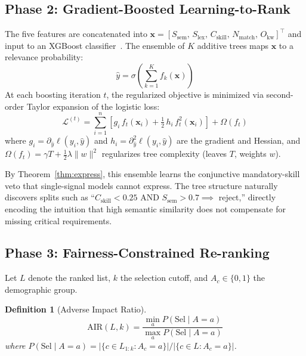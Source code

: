 \documentclass[smallcondensed,numbers]{sn-jnl}
\newtheorem{definition}{Definition}
\begin{document}
\subsection{Phase 2: Gradient-Boosted Learning-to-Rank}

The five features are concatenated into $\mathbf{x} = [S_{\mathrm{sem}},\, S_{\mathrm{lex}},\, C_{\mathrm{skill}},\, N_{\mathrm{match}},\, O_{\mathrm{kw}}]^\top$ and input to an XGBoost classifier~\cite{chen2016xgboost}. The ensemble of $K$ additive trees maps $\mathbf{x}$ to a relevance probability:
\begin{equation}
    \hat{y} = \sigma\!\left(\sum_{k=1}^K f_k(\mathbf{x})\right)
\end{equation}
At each boosting iteration $t$, the regularized objective is minimized via second-order Taylor expansion of the logistic loss:
\begin{equation}\label{eq:xgb}
    \mathcal{L}^{(t)} = \sum_{i=1}^n \left[ g_i\, f_t(\mathbf{x}_i) + \tfrac{1}{2}\, h_i\, f_t^2(\mathbf{x}_i) \right] + \Omega(f_t)
\end{equation}
where $g_i = \partial_{\hat{y}} \ell(y_i, \hat{y})$ and $h_i = \partial^2_{\hat{y}} \ell(y_i, \hat{y})$ are the gradient and Hessian, and $\Omega(f_t) = \gamma T + \frac{1}{2}\lambda\|w\|^2$ regularizes tree complexity (leaves $T$, weights $w$).

By Theorem~\ref{thm:express}, this ensemble learns the conjunctive mandatory-skill veto that single-signal models cannot express. The tree structure naturally discovers splits such as ``$C_\text{skill} < 0.25$ AND $S_\text{sem} > 0.7 \implies$ reject,'' directly encoding the intuition that high semantic similarity does not compensate for missing critical requirements.

\subsection{Phase 3: Fairness-Constrained Re-ranking}
\label{sec:fcr_method}

Let $L$ denote the ranked list, $k$ the selection cutoff, and $A_c \in \{0, 1\}$ the demographic group.

\begin{definition}[Adverse Impact Ratio]
\begin{equation}
    \mathrm{AIR}(L, k) = \frac{\min_a P(\text{Sel} \mid A{=}a)}{\max_a P(\text{Sel} \mid A{=}a)}
\end{equation}
where $P(\text{Sel} \mid A{=}a) = |\{c \in L_{1:k} : A_c = a\}| / |\{c \in L : A_c = a\}|$.
\end{definition}
\end{document}
